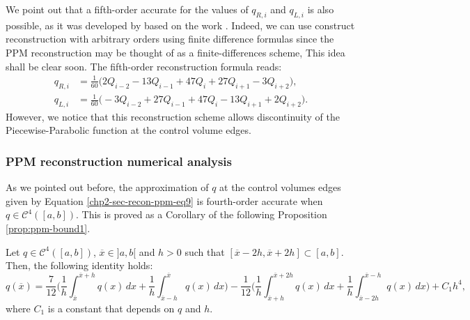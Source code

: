We point out that a fifth-order accurate for the values of $q_{R,i}$ and $q_{L,i}$
is also possible, as it was developed by \citet{putman:2007} 
based on the work \citet{suresh:1997}. 
Indeed, we can use construct reconstruction with arbitrary orders using finite difference
formulas since the PPM reconstruction may be thought of as a finite-differences scheme,
This idea shall be clear soon.
The fifth-order reconstruction formula reads:
\begin{align}
	\label{chp2-sec-recon-ppm-eq12}
	q_{R,i} &= \frac{1}{60} \bigg( 2Q_{i-2} - 13Q_{i-1} + 47Q_{i} + 27Q_{i+1} - 3Q_{i+2}\bigg), \\
	\label{chp2-sec-recon-ppm-eq13}
	q_{L,i} &= \frac{1}{60} \bigg(-3Q_{i-2} + 27Q_{i-1} + 47Q_{i} - 13Q_{i+1} + 2Q_{i+2}\bigg).
\end{align}
However, we notice that this reconstruction scheme allows discontinuity of the 
Piecewise-Parabolic function at the control volume edges.

\subsubsection{PPM reconstruction numerical analysis}
\label{chp2-sec-numerical-analysis}
As we pointed out before, the approximation of $q$ at the control volumes edges
given by Equation \eqref{chp2-sec-recon-ppm-eq9} is fourth-order accurate when $q \in \mathcal{C}^4([a,b])$. 
This is proved as a Corollary of the following Proposition \ref{prop:ppm-bound1}.
\begin{prop}
	\label{prop:ppm-bound1}
	Let $q \in \mathcal{C}^{4}([a,b])$, $\overline{x} \in ]a,b[ $ and $h>0$ such that 
	$[\overline{x}-2h,\overline{x}+2h] \subset [a,b]$.
	Then, the following identity holds:
	\begin{equation}
		\label{prop:ppm-bound1-eq1}
		q(\overline{x} ) = \frac{7}{12}\bigg( \frac{1}{h} \int_{\overline{x} }^{\overline{x}+h} q(x) \,dx 
		       + \frac{1}{h} \int_{\overline{x} -h}^{\overline{x} } q(x) \,dx  \bigg)
		       - \frac{1}{12}\bigg( \frac{1}{h} \int_{\overline{x} +h}^{\overline{x}+2h} q(x) \,dx 
		       + \frac{1}{h} \int_{\overline{x} -2h}^{\overline{x} -h} q(x) \,dx  \bigg) + C_1h^4,
	\end{equation}
	where $C_1$ is a constant that depends on $q$ and $h$.
\end{prop}


